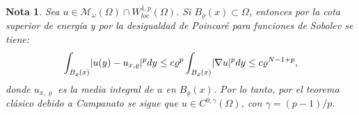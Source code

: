 \documentclass[a4paper,11pt,spanish, twoside, leqno]{tfm-uam}
\newtheorem{nota}[teo]{Nota}
\begin{document}
\begin{nota}\label{nota:holder continuidad de los cuasi minimizadores}
Sea $u\in \mathcal{M}_{\omega}(\Omega)\cap W^{1,p}_{loc}(\Omega)$. Si $B_{\varrho}(x)\subset \Omega$, entonces por la cota superior de energía y por la desigualdad de Poincaré para funciones de Sobolev se tiene:
\begin{align*}
\int_{B_{\varrho}(x)}\lvert u(y)-u_{x,\varrho}\rvert^{p}dy\leq c\varrho^{p}\int_{B_{\varrho}(x)}\lvert\nabla{u}\rvert^{p}dy\leq c\varrho^{N-1+p},
\end{align*}
donde $u_{x,\varrho}$ es la media integral de $u$ en $B_{\varrho}(x)$. Por lo tanto, por el teorema clásico debido a Campanato \cite[teorema 7.51]{ambrosio2000functions} se sigue que $u\in C^{0,\gamma}(\Omega)$, con $\gamma=(p-1)/p$.
\end{nota}
\end{document}
